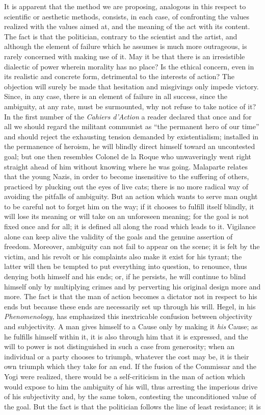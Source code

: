 \documentclass[11pt]{article}
\begin{document}
{{It is apparent that the method we are proposing, analogous in this respect to scientific or aesthetic methods, consists, in each case, of confronting the values realized with the values aimed at, and the meaning of the act with its content. The fact is that the politician, contrary to the scientist and the artist, and although the element of failure which he assumes is much more outrageous, is rarely concerned with making use of it. May it be that there is an irresistible dialectic of power wherein morality has no place? Is the ethical concern, even in its realistic and concrete form, detrimental to the interests of action? The objection will surely be made that hesitation and misgivings only impede victory. Since, in any case, there is an element of failure in all success, since the ambiguity, at any rate, must be surmounted, why not refuse to take notice of it? In the first number of the \textit{Cahiers d’Action }a reader declared that once and for all we should regard the militant communist as “the permanent hero of our time” and should reject the exhausting tension demanded by existentialism; installed in the permanence of heroism, he will blindly direct himself toward an uncontested goal; but one then resembles Colonel de la Roque who unwaveringly went right straight ahead of him without knowing where he was going. Malaparte relates that the young Nazis, in order to become insensitive to the suffering of others, practiced by plucking out the eyes of live cats; there is no more radical way of avoiding the pitfalls of ambiguity. But an action which wants to serve man ought to be careful not to forget him on the way; if it chooses to fulfill itself blindly, it will lose its meaning or will take on an unforeseen meaning; for the goal is not fixed once and for all; it is defined all along the road which leads to it. Vigilance alone can keep alive the validity of the goals and the genuine assertion of freedom. Moreover, ambiguity can not fail to appear on the scene; it is felt by the victim, and his revolt or his complaints also make it exist for his tyrant; the latter will then be tempted to put everything into question, to renounce, thus denying both himself and his ends; or, if he persists, he will continue to blind himself only by multiplying crimes and by perverting his original design more and more. The fact is that the man of action becomes a dictator not in respect to his ends but because these ends are necessarily set up through his will. Hegel, in his \textit{Phenomenology, }has emphasized this inextricable confusion between objectivity and subjectivity. A man gives himself to a Cause only by making it \textit{his }Cause; as he fulfills himself within it, it is also through him that it is expressed, and the will to power is not distinguished in such a case from generosity; when an individual or a party chooses to triumph, whatever the cost may be, it is their own triumph which they take for an end. If the fusion of the Commissar and the Yogi were realized, there would be a self-criticism in the man of action which would expose to him the ambiguity of his will, thus arresting the imperious drive of his subjectivity and, by the same token, contesting the unconditioned value of the goal. But the fact is that the politician follows the line of least resistance; it is }}
\end{document}
